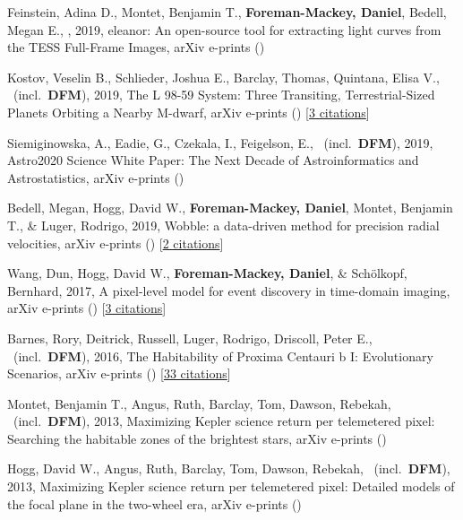 \item[{\color{numcolor}\scriptsize8}] Feinstein, Adina D., Montet, Benjamin T., \textbf{Foreman-Mackey, Daniel}, Bedell, Megan E., \etal, 2019, eleanor: An open-source tool for extracting light curves from the TESS Full-Frame Images, arXiv e-prints ()

\item[{\color{numcolor}\scriptsize7}] Kostov, Veselin B., Schlieder, Joshua E., Barclay, Thomas, Quintana, Elisa V., \etal\ (incl.\ \textbf{DFM}), 2019, The L 98-59 System: Three Transiting, Terrestrial-Sized Planets Orbiting a Nearby M-dwarf, arXiv e-prints () [\href{http://adsabs.harvard.edu/abs/2019arXiv190308017K}{3 citations}]

\item[{\color{numcolor}\scriptsize6}] Siemiginowska, A., Eadie, G., Czekala, I., Feigelson, E., \etal\ (incl.\ \textbf{DFM}), 2019, Astro2020 Science White Paper: The Next Decade of Astroinformatics and Astrostatistics, arXiv e-prints ()

\item[{\color{numcolor}\scriptsize5}] Bedell, Megan, Hogg, David W., \textbf{Foreman-Mackey, Daniel}, Montet, Benjamin T., \& Luger, Rodrigo, 2019, Wobble: a data-driven method for precision radial velocities, arXiv e-prints () [\href{http://adsabs.harvard.edu/abs/2019arXiv190100503B}{2 citations}]

\item[{\color{numcolor}\scriptsize4}] Wang, Dun, Hogg, David W., \textbf{Foreman-Mackey, Daniel}, \& Sch{\"o}lkopf, Bernhard, 2017, A pixel-level model for event discovery in time-domain imaging, arXiv e-prints () [\href{http://adsabs.harvard.edu/abs/2017arXiv171002428W}{3 citations}]

\item[{\color{numcolor}\scriptsize3}] Barnes, Rory, Deitrick, Russell, Luger, Rodrigo, Driscoll, Peter E., \etal\ (incl.\ \textbf{DFM}), 2016, The Habitability of Proxima Centauri b I: Evolutionary Scenarios, arXiv e-prints () [\href{http://adsabs.harvard.edu/abs/2016arXiv160806919B}{33 citations}]

\item[{\color{numcolor}\scriptsize2}] Montet, Benjamin T., Angus, Ruth, Barclay, Tom, Dawson, Rebekah, \etal\ (incl.\ \textbf{DFM}), 2013, Maximizing Kepler science return per telemetered pixel: Searching the habitable zones of the brightest stars, arXiv e-prints ()

\item[{\color{numcolor}\scriptsize1}] Hogg, David W., Angus, Ruth, Barclay, Tom, Dawson, Rebekah, \etal\ (incl.\ \textbf{DFM}), 2013, Maximizing Kepler science return per telemetered pixel: Detailed models of the focal plane in the two-wheel era, arXiv e-prints ()